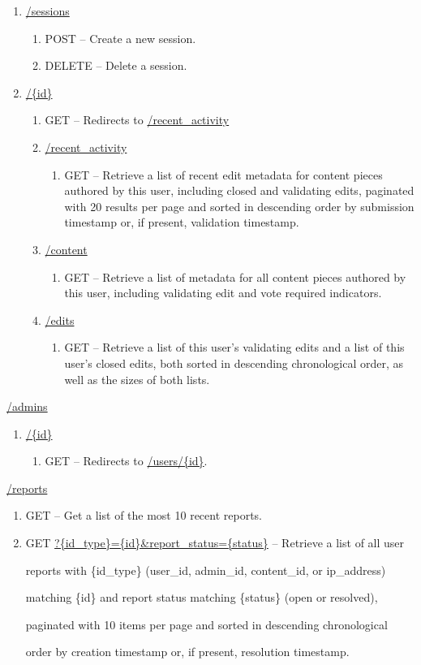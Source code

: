 \documentclass[12pt,letterpaper]{article}
\begin{document}
\begin{myEnumerate}
\begin{myEnumerate}
\begin{enumerate}
\item[] \url{/sessions}
\begin{enumerate}
\item[] POST -- Create a new session. 	%
\item[] DELETE -- Delete a session.	%
\end{enumerate}
\item[] \url{/{id}}
\begin{enumerate}
\item[] GET -- Redirects to \url{/recent_activity}
\item[] \url{/recent_activity}
\begin{enumerate}
\item[] GET -- Retrieve a list of recent edit metadata for content pieces authored by this user, including closed and validating edits, paginated with 20 results per page and sorted in descending order by submission timestamp or, if present, validation timestamp.
\end{enumerate}
\item[] \url{/content}
\begin{enumerate}
\item[] GET -- Retrieve a list of metadata for all content pieces authored by this user, including validating edit and vote required indicators.
\end{enumerate}
\item[] \url{/edits}
\begin{enumerate}
\item[] GET -- Retrieve a list of this user's validating edits and a list of this user's closed edits, both sorted in descending chronological order, as well as the sizes of both lists.
\end{enumerate}
\end{enumerate}
\end{enumerate}
\item[] \url{/admins}
\begin{enumerate}
\item[] \url{/{id}}
\begin{enumerate}
\item[] GET -- Redirects to \url{/users/{id}}.
\end{enumerate}
\end{enumerate}
\item[] \url{/reports}
\begin{enumerate}
\item[] GET -- Get a list of the most 10 recent reports.
\item[] GET \url{?{id_type}={id}&report_status={status}} -- Retrieve a list of all user \par reports with \{id\_type\} (user\_id, admin\_id, content\_id, or ip\_address) \par matching \{id\} and report status matching \{status\} (open or resolved), \par paginated with 10 items per page and sorted in descending chronological \par order by creation timestamp or, if present, resolution timestamp.

\end{enumerate}
\end{myEnumerate}
\end{myEnumerate}
\end{document}
